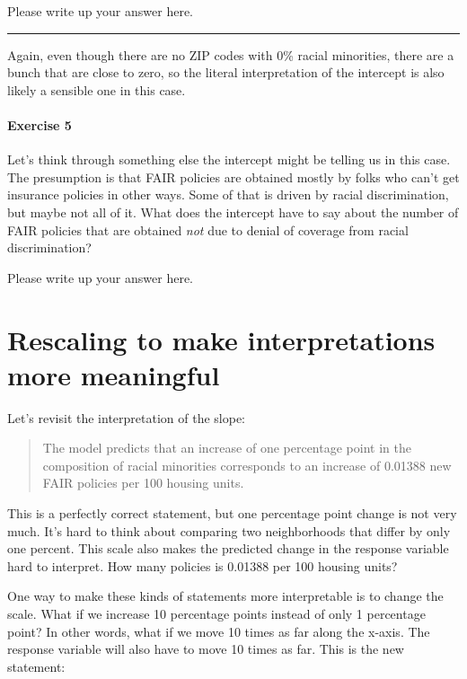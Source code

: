 \documentclass[
]{book}
\begin{document}
Please write up your answer here.

\begin{center}\rule{0.5\linewidth}{0.5pt}\end{center}

Again, even though there are no ZIP codes with 0\% racial minorities, there are a bunch that are close to zero, so the literal interpretation of the intercept is also likely a sensible one in this case.

\hypertarget{exercise-5-3}{%
\paragraph*{Exercise 5}\label{exercise-5-3}}

Let's think through something else the intercept might be telling us in this case. The presumption is that FAIR policies are obtained mostly by folks who can't get insurance policies in other ways. Some of that is driven by racial discrimination, but maybe not all of it. What does the intercept have to say about the number of FAIR policies that are obtained \emph{not} due to denial of coverage from racial discrimination?

Please write up your answer here.

\hypertarget{regression-rescaling}{%
\section{Rescaling to make interpretations more meaningful}\label{regression-rescaling}}

Let's revisit the interpretation of the slope:

\begin{quote}
The model predicts that an increase of one percentage point in the composition of racial minorities corresponds to an increase of 0.01388 new FAIR policies per 100 housing units.
\end{quote}

This is a perfectly correct statement, but one percentage point change is not very much. It's hard to think about comparing two neighborhoods that differ by only one percent. This scale also makes the predicted change in the response variable hard to interpret. How many policies is 0.01388 per 100 housing units?

One way to make these kinds of statements more interpretable is to change the scale. What if we increase 10 percentage points instead of only 1 percentage point? In other words, what if we move 10 times as far along the x-axis. The response variable will also have to move 10 times as far. This is the new statement:
\end{document}
